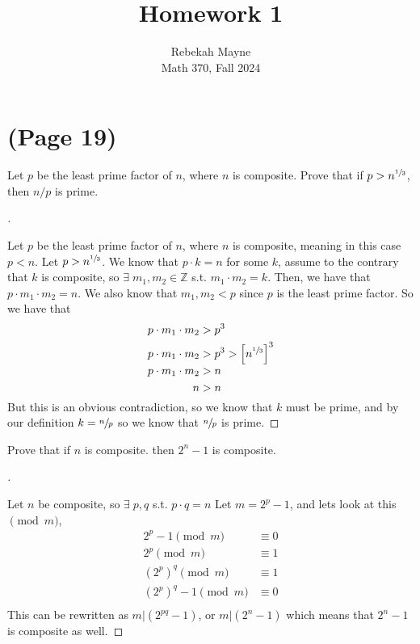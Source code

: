 \documentclass[11pt]{article}
\newcommand{\Z}{\mathbb{Z}}
\newenvironment{myproof}[1][\proofname]{%
  \begin{proof}[#1]$ $\par\nobreak\ignorespaces
}{%
  \end{proof}
}
\newenvironment{problem}[2][Problem]{\begin{trivlist}
\item[\hskip \labelsep {\bfseries #1}\hskip \labelsep {\bfseries #2.}]}{\end{trivlist}}
\begin{document}
\title{Homework 1}
\author{Rebekah Mayne\\
  Math 370, Fall 2024}
\maketitle


\section{(Page 19)}

\begin{problem}{12}
Let $p$ be the least prime factor of $n$, where $n$ is composite. Prove that if $p>n^{\sfrac{1}{3}}$, then $n/p$ is prime.
\end{problem}

\begin{myproof}
  Let $p$ be the least prime factor of $n$, where $n$ is composite, meaning in this case $p<n$. Let $p>n^{\sfrac{1}{3}}$. We know that $p\cdot k=n$ for some $k$, assume to the contrary that $k$ is composite, so $\exists \; m_1,m_2 \in\Z$ s.t. $m_1\cdot m_2=k$. Then, we have that $p\cdot m_1 \cdot m_2=n$. We also know that $m_1,m_2<p$ since $p$ is the least prime factor. So we have that
  \begin{align*}
    p\cdot m_1 \cdot m_2 & > p^3                                   \\
    p\cdot m_1 \cdot m_2 & > p^3 > \left[n^{\sfrac{1}{3}}\right]^3 \\
    p\cdot m_1 \cdot m_2 & > n                                     \\
    n                    & > n                                     \\
  \end{align*}
  But this is an obvious contradiction, so we know that $k$ must be prime, and by our definition $k=\sfrac{n}{p}$ so we know that $\sfrac{n}{p}$ is prime.
\end{myproof}


\begin{problem}{14}
Prove that if $n$ is composite. then $2^n-1$ is composite.
\end{problem}

\begin{myproof}
  Let $n$ be composite, so $\exists \; p,q$ s.t. $p\cdot q =n$ Let $m=2^p-1$, and lets look at this $\pmod{m}$,
  \begin{align*}
    2^p-1 \pmod{m}                   & \equiv 0 \\
    2^p \pmod{m}                     & \equiv 1 \\
    \left(2^{p}\right)^q \pmod{m}    & \equiv 1 \\
    \left(2^{p}\right)^q -1 \pmod{m} & \equiv 0 \\
  \end{align*}
  This can be rewritten as $m| \left(2^{pq} -1\right)$, or $m| \left(2^{n} -1\right)$ which means that $2^n-1$ is composite as well.
\end{myproof}
\end{document}
